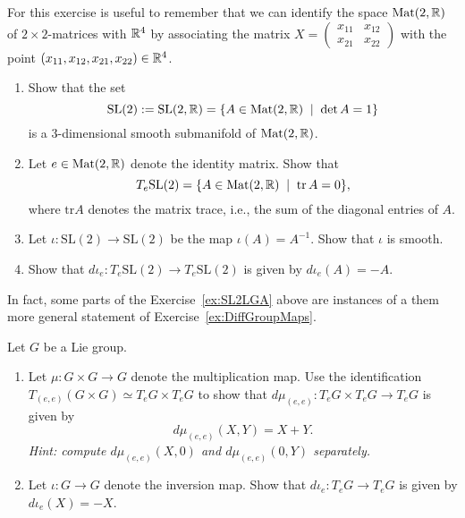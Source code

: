 \begin{exercise}\label{ex:SL2LGA}
	For this exercise is useful to remember that we can identify the space $\mathrm{Mat}(2,\mathbb{R})$ of $2\times 2$-matrices with $\mathbb{R}^4$ by associating the matrix $X = \begin{pmatrix}x_{11} & x_{12}\\ x_{21} & x_{22}\end{pmatrix}$ with the point $(x_{11}, x_{12}, x_{21}, x_{22})\in\mathbb{R}^4$.

	\begin{enumerate}
		\item Show that the set
		      \begin{equation*}
			      \mathrm{SL}(2) := \mathrm{SL}(2,\mathbb{R}) = \{ A\in \mathrm{Mat}(2,\mathbb{R}) \;\mid\; \det A = 1 \}
		      \end{equation*}
		      is a 3-dimensional smooth submanifold of $\mathrm{Mat}(2,\mathbb{R})$.
		\item Let $e\in\mathrm{Mat}(2,\mathbb{R})$ denote the identity matrix. Show that
		      \begin{equation*}
			      T_e \mathrm{SL}(2) = \{ A\in \mathrm{Mat}(2,\mathbb{R}) \;\mid\; \mathrm{tr}\, A = 0 \},
		      \end{equation*}
		      where $\mathrm{tr} A$ denotes the matrix trace, i.e., the sum of the diagonal entries of $A$.
		\item Let $\iota: \mathrm{SL}(2)\to \mathrm{SL}(2)$ be the map $\iota(A) = A^{-1}$. Show that $\iota$ is smooth.
		\item Show that $d\iota_e: T_e\mathrm{SL}(2)\to T_e\mathrm{SL}(2)$ is given by $d\iota_e(A) = -A$.
	\end{enumerate}
\end{exercise}

In fact, some parts of the Exercise~\ref{ex:SL2LGA} above are instances of a them more general statement of Exercise~\ref{ex:DiffGroupMaps}.

\begin{exercise}\label{ex:DiffGroupMaps}
	Let $G$ be a Lie group.
	\begin{enumerate}
		\item Let $\mu:G\times G\to G$ denote the multiplication map.
		      Use the identification $T_{(e,e)}(G\times G) \simeq T_eG\times T_eG$ to show that $d\mu_{(e,e)}:T_eG\times T_eG\to T_eG$ is given by
		      \begin{equation}
			      d\mu_{(e,e)}(X,Y) = X + Y.
		      \end{equation}
		      \textit{\small Hint: compute $d\mu_{(e,e)}(X,0)$ and $d\mu_{(e,e)}(0,Y)$ separately.}
		\item Let $\iota: G\to G$ denote the inversion map. Show that $d\iota_e:T_eG\to T_eG$ is given by $d\iota_e(X) = -X$.
	\end{enumerate}
\end{exercise}

